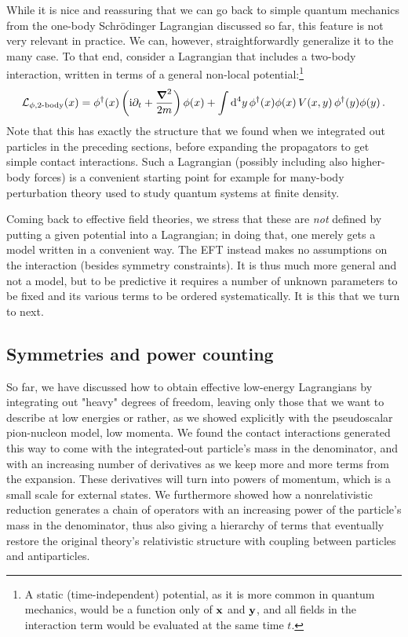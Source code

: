 While it is nice and reassuring that we can go back to simple quantum mechanics 
from the one-body Schr\"odinger Lagrangian discussed so far, this feature is 
not very relevant in practice.  We can, however, straightforwardly generalize 
it to the many case.  To that end, consider a Lagrangian that includes a 
two-body interaction, written in terms of a general non-local 
potential:\footnote{A static (time-independent) potential, as it is more common 
in quantum mechanics, would be a function only of $\mathbf{x}$ and $\mathbf{y}$, and all 
fields in the interaction term would be evaluated at the same time $t$.}
%
\begin{equation}
 \LL_{\phi,\text{2-body}}(x) = \phi^\dagger(x)
 \left(\ii\partial_t + \frac{\Laplace}{2m}\right)\phi(x)
 + \int\dd^4 y \, \phi^\dagger(x) \phi(x)
 \, V(x,y) \, \phi^\dagger(y) \phi(y) \,.
\label{eq:L-phi-V2-nonrel-hat}
\end{equation}
%
Note that this has exactly the structure that we found when we integrated out 
particles in the preceding sections, before expanding the propagators to get 
simple contact interactions.  Such a Lagrangian (possibly including also 
higher-body forces) is a convenient starting point for example for many-body 
perturbation theory used to study quantum systems at finite density.

Coming back to effective field theories, we stress that these are \emph{not} 
defined by putting a given potential into a Lagrangian; in doing that, 
one merely gets a model written in a convenient way.  The EFT instead makes no 
assumptions on the interaction (besides symmetry constraints).  It is thus much 
more general and not a model, but to be predictive it requires a number of 
\apriori unknown parameters to be fixed and its various terms to be ordered 
systematically.  It is this that we turn to next.

\subsection{Symmetries and power counting}

So far, we have discussed how to obtain effective low-energy Lagrangians by 
integrating out "heavy" degrees of freedom, leaving only those that we want  
to describe at low energies or rather, as we showed explicitly with the 
pseudoscalar pion-nucleon model, low momenta.  We found the contact 
interactions generated this way to come with the integrated-out particle's mass 
in the denominator, and with an increasing number of derivatives as we keep 
more and more terms from the expansion.  These derivatives will turn into 
powers of momentum, which is a small scale for external states.  We furthermore 
showed how a nonrelativistic reduction generates a chain of operators with an 
increasing power of the particle's mass in the denominator, thus also giving a 
hierarchy of terms that eventually restore the original theory's relativistic 
structure with coupling between particles and antiparticles.

